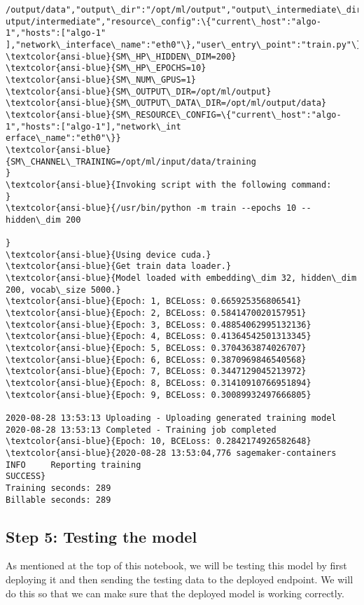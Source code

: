 \documentclass[11pt]{article}
\begin{document}
\begin{Verbatim}[commandchars=\\\{\}]
/output/data","output\_dir":"/opt/ml/output","output\_intermediate\_dir":"/opt/ml/o
utput/intermediate","resource\_config":\{"current\_host":"algo-1","hosts":["algo-1"
],"network\_interface\_name":"eth0"\},"user\_entry\_point":"train.py"\}}
\textcolor{ansi-blue}{SM\_HP\_HIDDEN\_DIM=200}
\textcolor{ansi-blue}{SM\_HP\_EPOCHS=10}
\textcolor{ansi-blue}{SM\_NUM\_GPUS=1}
\textcolor{ansi-blue}{SM\_OUTPUT\_DIR=/opt/ml/output}
\textcolor{ansi-blue}{SM\_OUTPUT\_DATA\_DIR=/opt/ml/output/data}
\textcolor{ansi-blue}{SM\_RESOURCE\_CONFIG=\{"current\_host":"algo-1","hosts":["algo-1"],"network\_int
erface\_name":"eth0"\}}
\textcolor{ansi-blue}{SM\_CHANNEL\_TRAINING=/opt/ml/input/data/training
}
\textcolor{ansi-blue}{Invoking script with the following command:
}
\textcolor{ansi-blue}{/usr/bin/python -m train --epochs 10 --hidden\_dim 200

}
\textcolor{ansi-blue}{Using device cuda.}
\textcolor{ansi-blue}{Get train data loader.}
\textcolor{ansi-blue}{Model loaded with embedding\_dim 32, hidden\_dim 200, vocab\_size 5000.}
\textcolor{ansi-blue}{Epoch: 1, BCELoss: 0.665925356806541}
\textcolor{ansi-blue}{Epoch: 2, BCELoss: 0.5841470020157951}
\textcolor{ansi-blue}{Epoch: 3, BCELoss: 0.48854062995132136}
\textcolor{ansi-blue}{Epoch: 4, BCELoss: 0.41364542501313345}
\textcolor{ansi-blue}{Epoch: 5, BCELoss: 0.3704363874026707}
\textcolor{ansi-blue}{Epoch: 6, BCELoss: 0.3870969846540568}
\textcolor{ansi-blue}{Epoch: 7, BCELoss: 0.3447129045213972}
\textcolor{ansi-blue}{Epoch: 8, BCELoss: 0.31410910766951894}
\textcolor{ansi-blue}{Epoch: 9, BCELoss: 0.30089932497666805}

2020-08-28 13:53:13 Uploading - Uploading generated training model
2020-08-28 13:53:13 Completed - Training job completed
\textcolor{ansi-blue}{Epoch: 10, BCELoss: 0.2842174926582648}
\textcolor{ansi-blue}{2020-08-28 13:53:04,776 sagemaker-containers INFO     Reporting training
SUCCESS}
Training seconds: 289
Billable seconds: 289
    \end{Verbatim}

    \hypertarget{step-5-testing-the-model}{%
\subsection{Step 5: Testing the model}\label{step-5-testing-the-model}}

As mentioned at the top of this notebook, we will be testing this model
by first deploying it and then sending the testing data to the deployed
endpoint. We will do this so that we can make sure that the deployed
model is working correctly.
\end{document}
